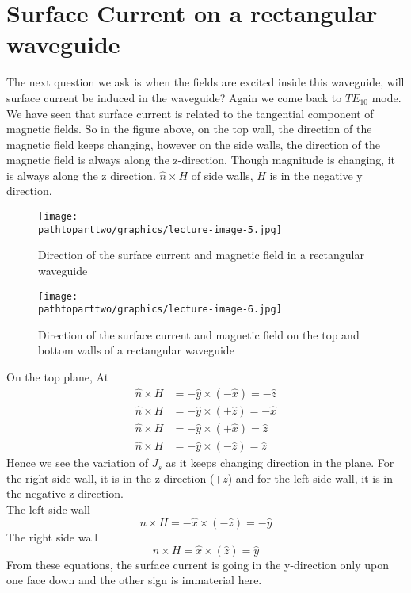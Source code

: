 \section{Surface Current on a rectangular waveguide}
The next question we ask is when the fields are excited inside this waveguide, will surface current be induced in the waveguide? Again we come back to $TE_{10}$ mode. We have seen that surface current is related to the tangential component of magnetic fields. So in the figure above, on the top wall, the direction of the magnetic field keeps changing, however on the side walls, the direction of the magnetic field is always along the z-direction. Though magnitude is changing, it is always along the z direction. $\hat{n} \times H$ of side walls, $H$ is in the negative y direction.
\begin{figure}[h]
\centering
\texttt{[image: \\pathtoparttwo/graphics/lecture-image-5.jpg]}
\label{fig:lectureimage5}
\caption{Direction of the surface current and magnetic field in a rectangular waveguide}
\end{figure}
\begin{figure}[h]
\centering
\texttt{[image: \\pathtoparttwo/graphics/lecture-image-6.jpg]}
\label{fig:lectureimage6}
\caption{Direction of the surface current and magnetic field on the top and bottom walls of a rectangular waveguide}
\end{figure}

On the top plane, At
\begin{align*}
\hat{n} \times H &= -\hat{y} \times (-\hat{x})= -\hat{z}\\
\hat{n} \times H &= -\hat{y} \times (+\hat{z})= -\hat{x}\\
\hat{n} \times H &= -\hat{y} \times (+\hat{x})= \hat{z}\\
\hat{n} \times H &= -\hat{y} \times (-\hat{z})= \hat{z}
\end{align*}
Hence we see the variation of $J_{s}$ as it keeps changing direction in the plane. For the right side wall, it is in the z direction ($+z$) and for the left side wall, it is in the negative z direction.\\
The left side wall   
\begin{equation}
n\times H = -\hat{x} \times (-\hat{z})= -\hat{y}
\label{eqn:negy}
\end{equation}
The right side wall 
\begin{equation}
n \times H = \hat{x} \times (\hat{z}) = \hat{y}
\label{eqn:posy}
\end{equation}
From these equations, the surface current is going in the y-direction only upon one face down and the other sign is immaterial here.
	

